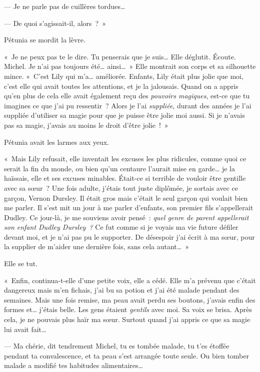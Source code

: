 --- Je ne parle pas de cuillères tordues…

--- De quoi s'agissait-il, alors~?~»

Pétunia se mordit la lèvre.

«~Je ne peux pas te le dire. Tu penserais que je suis… Elle déglutit. Écoute. Michel. Je n'ai pas toujours été… ainsi…~» Elle montrait son corps et sa silhouette mince.
«~C'est Lily qui m'a… améliorée. Enfants, Lily était plus jolie que moi, c'est elle qui avait toutes les attentions, et je la jalousais. Quand on a appris qu'en plus de cela elle avait également reçu des \emph{pouvoirs magiques}, est-ce que tu imagines ce que j'ai pu ressentir~? Alors je l'ai \emph{suppliée}, durant des années je l'ai suppliée d'utiliser sa magie pour que je puisse être jolie moi aussi. Si je n'avais pas sa magie, j'avais au moins le droit d'être jolie~!~»

Pétunia avait les larmes aux yeux.

«~Mais Lily refusait, elle inventait les excuses les plus ridicules, comme quoi ce serait la fin du monde, ou bien qu'un centaure l'aurait mise en garde… je la haïssais, elle et ses excuses minables. Était-ce si terrible de vouloir être gentille avec sa sœur~? Une fois adulte, j'étais tout juste diplômée, je sortais avec ce garçon, Vernon Dursley. Il était gros mais c'était le seul garçon qui voulait bien me parler.  Il s'est mit un jour à me parler d'enfants, son premier fils s'appellerait Dudley. Ce jour-là, je me souviens avoir pensé~: \emph{quel genre de parent appellerait son enfant Dudley Dursley~?} Ce fut comme si je voyais ma vie future défiler devant moi, et je n'ai pas pu le supporter. De désespoir j'ai écrit à ma sœur, pour la supplier de m'aider une dernière fois, sans cela autant…~»

Elle se tut.

«~Enfin, continua-t-elle d'une petite voix, elle a cédé.  Elle m'a prévenu que c'était dangereux mais m'en fichais, j'ai bu sa potion et j'ai été malade pendant des semaines. Mais une fois remise, ma peau avait perdu ses boutons, j'avais enfin des formes et… j'étais belle. Les gens étaient \emph{gentils} avec moi. Sa voix se brisa. Après cela, je ne pouvais plus haïr ma sœur. Surtout quand j'ai appris ce que sa magie lui avait fait…

--- Ma chérie, dit tendrement Michel, tu es tombée malade, tu t'es étoffée pendant ta convalescence, et ta peau s'est arrangée toute seule. Ou bien tomber malade a modifié tes habitudes alimentaires…

